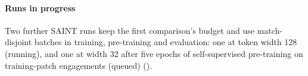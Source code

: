 \paragraph{Runs in progress}
Two further SAINT runs keep the first comparison's budget and use match-disjoint batches in training,
pre-training and evaluation: one at token width 128 (running), and one at width 32 after five epochs of
self-supervised pre-training on training-patch engagements (queued)
().

